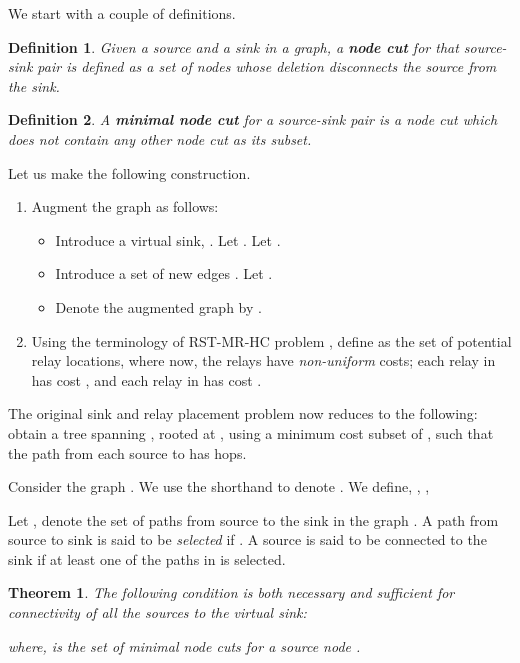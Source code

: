 \documentclass[conference]{IEEEtran}
\newtheorem{theorem}{Theorem}
\newtheorem{definition}{Definition}
\begin{document}
\noindent
We start with a couple of definitions.

\begin{definition}
Given a source and a sink in a graph, a \emph{\textbf{node cut} for that source-sink pair} is defined as a set of nodes whose deletion disconnects the source from the sink. 
\end{definition}

\begin{definition}
A \emph{\textbf{minimal node cut} for a source-sink pair} is a node cut which does not contain any other node cut as its subset. 
\end{definition}

Let us make the following construction.

\begin{enumerate}
\item Augment the graph  as follows:
\begin{itemize}
\item Introduce a virtual sink, . Let . Let .
\item Introduce a set of new edges . Let .
\item Denote the augmented graph by .
\end{itemize}
\item Using the terminology of RST-MR-HC problem \cite{fullpaper}, define  as the set of potential relay locations, where now, the relays have \emph{non-uniform} costs; each relay in  has cost , and each relay in  has cost . 
\end{enumerate}

The original sink and relay placement problem now reduces to the following: obtain a tree spanning , rooted at , using a minimum cost subset of , such that the path from each source to  has  hops. 

Consider the graph . We use the shorthand  to denote . We define, , ,


Let , denote the set of paths from source  to the sink in the graph . A path  from source  to sink is said to be \emph{selected} if . A source  is said to be connected to the sink if at least one of the paths in  is selected.
 
\begin{theorem}
The following condition is both \emph{necessary and sufficient} for connectivity of all the sources to the virtual sink:


where,  is the set of minimal node cuts for a source node .
\end{theorem}
\end{document}
